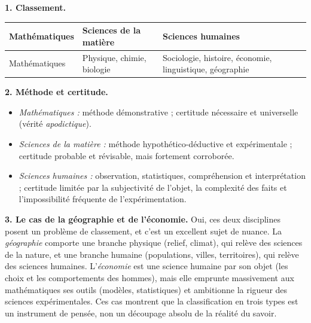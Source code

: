 \documentclass[11pt]{article}
\begin{document}
\begin{corrige}
\textbf{1. Classement.}
\begin{center}
\begin{tabularx}{\linewidth}{|l|X|X|}
\hline
\rowcolor{popblueL} \textbf{Mathématiques} & \textbf{Sciences de la matière} & \textbf{Sciences humaines} \\
\hline
Mathématiques & Physique, chimie, biologie & Sociologie, histoire, économie, linguistique, géographie \\
\hline
\end{tabularx}
\end{center}

\textbf{2. Méthode et certitude.}
\begin{itemize}
\item \emph{Mathématiques :} méthode démonstrative ; certitude nécessaire et universelle (vérité \emph{apodictique}).
\item \emph{Sciences de la matière :} méthode hypothético-déductive et expérimentale ; certitude probable et révisable, mais fortement corroborée.
\item \emph{Sciences humaines :} observation, statistiques, compréhension et interprétation ; certitude limitée par la subjectivité de l'objet, la complexité des faits et l'impossibilité fréquente de l'expérimentation.
\end{itemize}

\textbf{3. Le cas de la géographie et de l'économie.} Oui, ces deux disciplines posent un problème de classement, et c'est un excellent sujet de nuance. La \emph{géographie} comporte une branche physique (relief, climat), qui relève des sciences de la nature, et une branche humaine (populations, villes, territoires), qui relève des sciences humaines. L'\emph{économie} est une science humaine par son objet (les choix et les comportements des hommes), mais elle emprunte massivement aux mathématiques ses outils (modèles, statistiques) et ambitionne la rigueur des sciences expérimentales. Ces cas montrent que la classification en trois types est un instrument de pensée, non un découpage absolu de la réalité du savoir.
\end{corrige}
\end{document}
